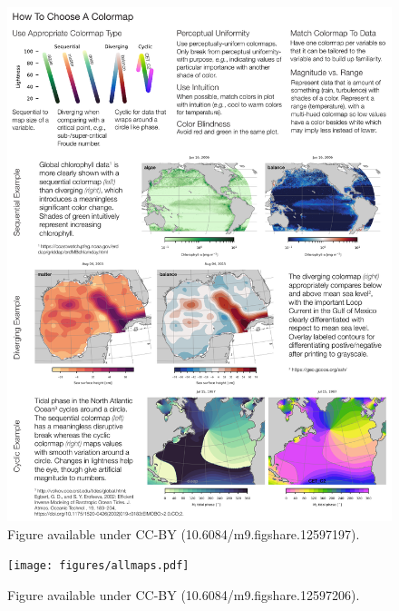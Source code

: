\documentclass[10pt,journal,compsoc]{IEEEtran}
\begin{document}
\begin{figure}
	\includegraphics[width=\textwidth]{figures/howtochoose.pdf}
	\caption{Figure available under CC-BY (10.6084/m9.figshare.12597197).}
	\label{fig:howtochoose}
\end{figure}

\begin{figure}
	\texttt{[image: figures/allmaps.pdf]}
	\caption{Figure available under CC-BY (10.6084/m9.figshare.12597206).}
	\label{fig:allmaps}
\end{figure}
\end{document}
